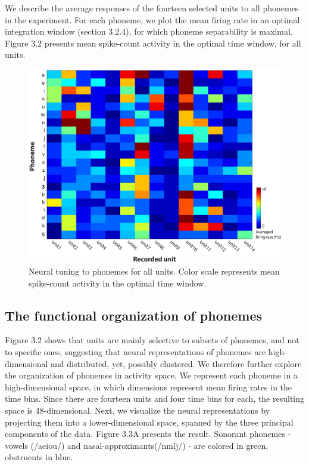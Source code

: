 We describe the average responses of the fourteen selected units to all phonemes in the experiment. For each phoneme, we plot the mean firing rate in an optimal integration window (section 3.2.4), for which phoneme separability is maximal. Figure 3.2 presents mean spike-count activity in the optimal time window, for all units.

\begin{figure}[H]
\vspace{.3in}
\includegraphics[width=\linewidth]{Figures/Ch3/Figure3_new.eps}
\caption{Neural tuning to phonemes for all units. Color scale represents mean spike-count activity in the optimal time window.}
\end{figure}

\subsection{The functional organization of phonemes}
Figure 3.2 shows that units are mainly selective to subsets of phonemes, and not to specific ones, suggesting that neural representations of phonemes are high-dimensional and distributed, yet, possibly clustered. We therefore further explore the organization of phonemes in activity space. We represent each phoneme in a high-dimensional space, in which dimensions represent mean firing rates in the time bins. Since there are fourteen units and four time bins for each, the resulting space is 48-dimensional. Next, we visualize the neural representations by projecting them into a lower-dimensional space, spanned by the three principal components of the data. Figure 3.3A presents the result. Sonorant phonemes - vowels (/aeiou/) and nasal-approximants(/nmlj/) - are colored in green, obstruents in blue.

